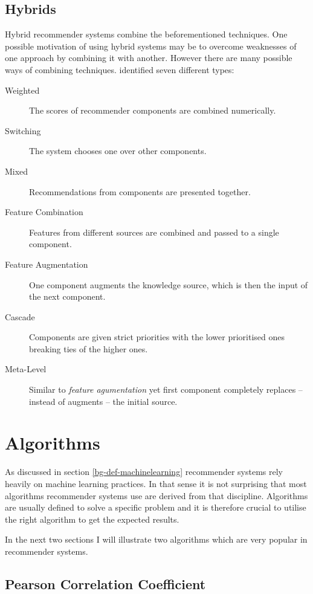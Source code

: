 \subsection{Hybrids}

Hybrid recommender systems combine the beforementioned techniques. One possible motivation of using hybrid systems may be to overcome weaknesses of one approach by combining it with another. However there are many possible ways of combining techniques. \citet{burke07} identified seven different types:

\begin{description}
    \item[Weighted] The scores of recommender components are combined numerically.
    \item[Switching] The system chooses one over other components.
    \item[Mixed] Recommendations from components are presented together.
    \item[Feature Combination] Features from different sources are combined and passed to a single component.
    \item[Feature Augmentation] One component augments the knowledge source, which is then the input of the next component.
    \item[Cascade] Components are given strict priorities with the lower prioritised ones breaking ties of the higher ones.
    \item[Meta-Level] Similar to \textit{feature agumentation} yet first component completely replaces -- instead of augments -- the initial source.
\end{description}



\section{Algorithms}

As discussed in section \ref{bg-def-machinelearning} recommender systems rely heavily on machine learning practices. In that sense it is not surprising that most algorithms recommender systems use are derived from that discipline. Algorithms are usually defined to solve a specific problem and it is therefore crucial to utilise the right algorithm to get the expected results.

In the next two sections I will illustrate two algorithms which are very popular in recommender systems.

\subsection{Pearson Correlation Coefficient}


